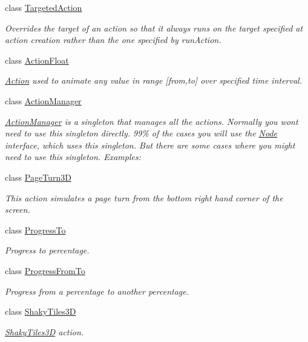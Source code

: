 \begin{DoxyCompactItemize}
class \hyperlink{classTargetedAction}{Targeted\+Action}
\begin{DoxyCompactList}\small\item\em Overrides the target of an action so that it always runs on the target specified at action creation rather than the one specified by run\+Action. \end{DoxyCompactList}\item 
class \hyperlink{classActionFloat}{Action\+Float}
\begin{DoxyCompactList}\small\item\em \hyperlink{classAction}{Action} used to animate any value in range \mbox{[}from,to\mbox{]} over specified time interval. \end{DoxyCompactList}\item 
class \hyperlink{classActionManager}{Action\+Manager}
\begin{DoxyCompactList}\small\item\em \hyperlink{classActionManager}{Action\+Manager} is a singleton that manages all the actions. Normally you won\textquotesingle{}t need to use this singleton directly. 99\% of the cases you will use the \hyperlink{classNode}{Node} interface, which uses this singleton. But there are some cases where you might need to use this singleton. Examples\+: \end{DoxyCompactList}\item 
class \hyperlink{classPageTurn3D}{Page\+Turn3D}
\begin{DoxyCompactList}\small\item\em This action simulates a page turn from the bottom right hand corner of the screen. \end{DoxyCompactList}\item 
class \hyperlink{classProgressTo}{Progress\+To}
\begin{DoxyCompactList}\small\item\em Progress to percentage. \end{DoxyCompactList}\item 
class \hyperlink{classProgressFromTo}{Progress\+From\+To}
\begin{DoxyCompactList}\small\item\em Progress from a percentage to another percentage. \end{DoxyCompactList}\item 
class \hyperlink{classShakyTiles3D}{Shaky\+Tiles3D}
\begin{DoxyCompactList}\small\item\em \hyperlink{classShakyTiles3D}{Shaky\+Tiles3D} action. \end{DoxyCompactList}\item 

\end{DoxyCompactItemize}
